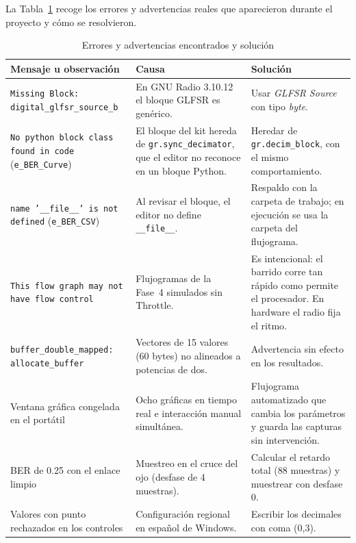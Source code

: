 La Tabla~\ref{tab:errores} recoge los errores y advertencias reales que aparecieron durante el proyecto y cómo se resolvieron.

\begin{table}[t]
    \centering
    \caption{Errores y advertencias encontrados y solución}
    \label{tab:errores}
    \footnotesize
    \begin{tabular}{@{}p{5.6cm}p{5.0cm}p{5.8cm}@{}}
        \toprule
        \textbf{Mensaje u observación} & \textbf{Causa} & \textbf{Solución} \\
        \midrule
        \texttt{Missing Block: digital\_glfsr\_source\_b} & En GNU Radio 3.10.12 el bloque GLFSR es genérico. & Usar \emph{GLFSR Source} con tipo \emph{byte}. \\
        \texttt{No python block class found in code} (\texttt{e\_BER\_Curve}) & El bloque del kit hereda de \texttt{gr.sync\_decimator}, que el editor no reconoce en un bloque Python. & Heredar de \texttt{gr.decim\_block}, con el mismo comportamiento. \\
        \texttt{name '\_\_file\_\_' is not defined} (\texttt{e\_BER\_CSV}) & Al revisar el bloque, el editor no define \texttt{\_\_file\_\_}. & Respaldo con la carpeta de trabajo; en ejecución se usa la carpeta del flujograma. \\
        \texttt{This flow graph may not have flow control} & Flujogramas de la Fase~4 simulados sin Throttle. & Es intencional: el barrido corre tan rápido como permite el procesador. En hardware el radio fija el ritmo. \\
        \texttt{buffer\_double\_mapped: allocate\_buffer} & Vectores de 15 valores (60 bytes) no alineados a potencias de dos. & Advertencia sin efecto en los resultados. \\
        Ventana gráfica congelada en el portátil & Ocho gráficas en tiempo real e interacción manual simultánea. & Flujograma automatizado que cambia los parámetros y guarda las capturas sin intervención. \\
        BER de 0.25 con el enlace limpio & Muestreo en el cruce del ojo (desfase de 4 muestras). & Calcular el retardo total (88 muestras) y muestrear con desfase 0. \\
        Valores con punto rechazados en los controles & Configuración regional en español de Windows. & Escribir los decimales con coma (0,3). \\
        \bottomrule
    \end{tabular}
\end{table}

